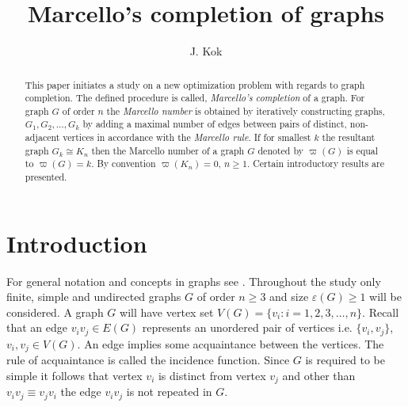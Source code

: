 \documentclass[12pt]{amsart}
\numberwithin{equation}{section}
\numberwithin{equation}{section}
\begin{document}




\title{Marcello's completion of graphs}
\author{J. Kok} 
\address {Independent Mathematics Researcher, City of Tshwane, South Africa.}
\date{}

\maketitle

\begin{abstract}
This paper initiates a study on a new optimization problem with regards to graph completion. The defined procedure is called, \emph{Marcello's completion} of a graph. For graph $G$ of order $n$ the \emph{Marcello number} is obtained by iteratively constructing graphs, $G_1,G_2,\dots,G_k$ by adding a maximal number of edges between pairs of distinct, non-adjacent vertices in accordance with the \emph{Marcello rule}. If for smallest $k$ the resultant graph $G_k \cong K_n$ then the Marcello number of a graph $G$ denoted by $\varpi(G)$ is equal to $\varpi(G) = k$. By convention $\varpi(K_n) = 0$, $n \geq 1$. Certain introductory results are presented.
\end{abstract}
\section{Introduction}
For general notation and concepts in graphs see \cite{bondy, harary, west}. Throughout the study only finite, simple and undirected graphs $G$ of order $n \geq 3$ and size $\varepsilon(G) \geq 1$ will be considered. A graph $G$ will have vertex set $V(G) = \{v_i: i = 1,2,3,\dots,n\}$. Recall that an edge $v_iv_j \in E(G)$ represents an unordered pair of vertices i.e. $\{v_i,v_j\}$, $v_i,v_j \in V(G)$. An edge implies some acquaintance between the vertices. The rule of acquaintance is called the incidence function. Since $G$ is required to be simple it follows that vertex $v_i$ is distinct from vertex $v_j$ and other than $v_iv_j \equiv v_jv_i$ the edge $v_iv_j$ is not repeated in $G$.
\end{document}
